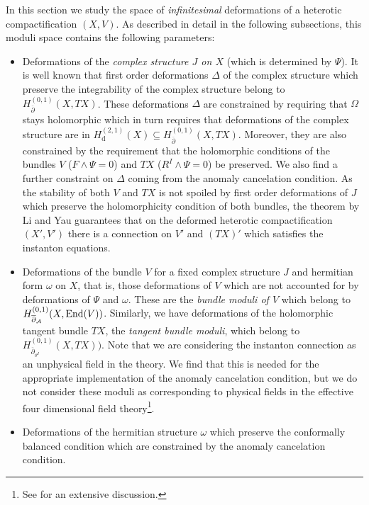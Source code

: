 \documentclass[12pt,a4paper]{article}
\def\bar#1{\overline{#1}}
\def\d{\textrm{d}}
\def\End{\textrm{End}}
\theoremstyle{definition}
\begin{document}
In this section we study the space of {\it infinitesimal} deformations of a heterotic compactification $(X,V)$.  As described in detail in the following subsections, this moduli space contains the following parameters:

\begin{itemize}
\item Deformations of the {\it complex structure $J$ on $X$} (which is determined by $\Psi$).  It is well known that first order deformations $\Delta$ of the complex structure which preserve the integrability of the complex structure  belong to $H_{\bar\partial}^{(0,1)}(X, TX)$.  These deformations $\Delta$ are constrained by requiring that $\Omega$ stays holomorphic which in turn requires that deformations of the complex structure are in $H_\d^{(2,1)}(X)\subseteq H_{\bar\partial}^{(0,1)}(X, TX)$.  Moreover, they are also constrained by the requirement that the holomorphic conditions of the bundles $V$ ($F\wedge\Psi = 0$) and $TX$ ($R^I\wedge\Psi = 0$) be preserved. We also find a further constraint on $\Delta$ coming from the anomaly cancelation condition.  As the stability of both $V$ and $TX$ is not spoiled by first order deformations of $J$ which preserve the holomorphicity condition of both bundles, 
the theorem by Li and Yau guarantees that on the deformed heterotic compactification $(X',V')$ there is a connection on $V'$ and $(TX)'$ which satisfies the instanton equations.
\item Deformations of the bundle $V$ for a fixed complex structure $J$ and hermitian form $\omega$ on $X$, that is, those deformations of $V$ which are not accounted for by deformations of $\Psi$ and $\omega$.  
These are the {\it bundle moduli of $V$} which belong to $H_{\bar\partial_{\cal A}}^{(0,1)}(X, \End(V))$.  Similarly, we have deformations of the holomorphic tangent bundle $TX$, the {\it tangent bundle moduli}, which belong to $H_{\bar\partial_{\vartheta^I}}^{(0,1)}(X, TX))$.  Note that we are considering the instanton connection as an unphysical field in the theory.  We find that this is needed for the appropriate implementation of the anomaly cancelation condition, but we do not consider these moduli as corresponding to physical fields in the effective four dimensional field theory\footnote{See \citep{delaossa2014} for an extensive discussion.}.
\item Deformations of the hermitian structure $\omega$ which preserve the conformally balanced condition which are constrained by the anomaly cancelation condition.   
\end{itemize}
\end{document}
